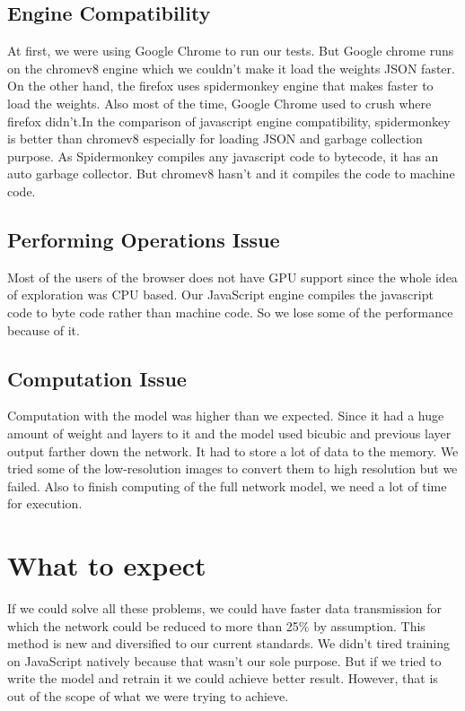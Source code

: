 \documentclass[a4paper,12pt]{article}
\begin{document}
\subsection{Engine Compatibility}
At first, we were using Google Chrome to run our tests. But Google chrome runs on the chromev8 engine which we couldn't make it load the weights JSON faster. On the other hand, the firefox uses spidermonkey engine that makes faster to load the weights. Also most of the time, Google Chrome used to crush where firefox didn't.In the comparison of javascript engine compatibility, spidermonkey is better than chromev8 especially for loading JSON and garbage collection purpose.
As Spidermonkey compiles any javascript code to bytecode, it has an auto garbage collector. But chromev8 hasn't and it compiles the code to machine code.


\subsection{Performing Operations Issue }
Most of the users of the browser does not have GPU support since the whole idea of exploration was CPU based. Our JavaScript engine compiles the javascript code to byte code rather than machine code. So we lose some of the performance because of it. 

\subsection{Computation Issue}
Computation with the model was higher than we expected. Since it had a huge amount of weight and layers to it and the model used bicubic and previous layer output farther down the network. It had to store a lot of data to the memory. We tried some of the low-resolution images to convert them to high resolution but we failed. Also to finish computing of the full network model,
we need a lot of time for execution.


\section{What to expect}
If we could solve all these problems, we could have faster data transmission for which the network could be reduced to more than 25\% by assumption. This method is new and diversified to our current standards. We didn't tired training on JavaScript natively because that wasn't our sole purpose. But if we tried to write the model and retrain it we could achieve better result. However, that is out of the scope of what we were trying to achieve.
\end{document}
